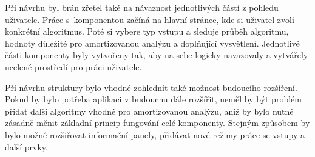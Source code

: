 Při návrhu byl brán zřetel také na návaznost jednotlivých částí z pohledu uživatele. Práce s~komponentou začíná na hlavní stránce, kde si uživatel zvolí konkrétní algoritmus. Poté si vybere typ vstupu a sleduje průběh algoritmu, hodnoty důležité pro amortizovanou analýzu a doplňující vysvětlení. Jednotlivé části komponenty byly vytvořeny tak, aby na sebe logicky navazovaly a vytvářely ucelené prostředí pro práci uživatele.

Při návrhu struktury bylo vhodné zohlednit také možnost budoucího rozšíření. Pokud by bylo potřeba aplikaci v budoucnu dále rozšířit, neměl by být problém přidat další algoritmy vhodné pro amortizovanou analýzu, aniž by bylo nutné zásadně měnit základní princip fungování celé komponenty. Stejným způsobem by bylo možné rozšiřovat informační panely, přidávat nové režimy práce se vstupy a další prvky.